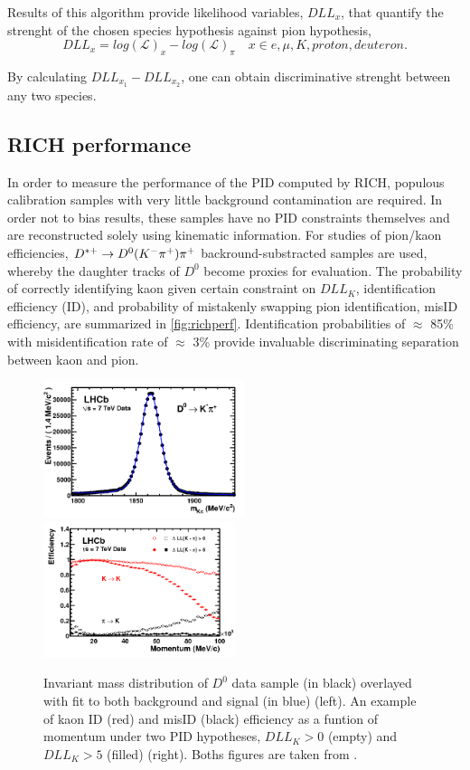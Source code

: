 Results of this algorithm provide likelihood variables, $DLL_{x}$, that quantify the strenght of the chosen species hypothesis against pion hypothesis,
\begin{equation}
	DLL_{x} = log(\mathcal{L})_{x} - log(\mathcal{L})_{\pi} \quad  x\in{e, \mu, K, proton, deuteron}.
\end{equation}

By calculating $DLL_{x_{1}} - DLL_{x_{2}}$, one can obtain discriminative strenght between any two species.

\subsection{RICH performance}
In order to measure the performance of the \Gls{PID} computed by RICH, populous calibration samples with very little background contamination are required. In order not to bias results, these samples have no \Gls{PID} constraints themselves and are reconstructed solely using kinematic information. For studies of pion/kaon efficiencies, $D^{*+} \rightarrow D^{0}({K}^{-}{{\pi}^+}){{\pi}^+}$ backround-substracted samples are used, whereby the daughter tracks of $D^{0}$ become proxies for evaluation. The probability of correctly identifying kaon given certain constraint on $DLL_{K}$, identification efficiency (\Gls{ID}), and probability of mistakenly swapping pion identification, \Gls{misID} efficiency, are summarized in \autoref{fig:richperf}. Identification probabilities of $\approx$ 85\% with misidentification rate of $\approx$ 3\% provide invaluable discriminating separation between kaon and pion.




\begin{figure}[!h]
	\centering
	\includegraphics[width = 0.525\textwidth]{figs/detector/D0mass.png}%
	\includegraphics[width = 0.5\textwidth]{figs/detector/RICHperfdata.png}%
	\caption{Invariant mass distribution of $D^{0}$ data sample (in black) overlayed with fit to both background and signal (in blue) (left). An example of kaon \Gls{ID} (red) and \Gls{misID} (black) efficiency as a funtion of momentum under two PID hypotheses, $DLL_{K} > 0$ (empty)  and $DLL_{K} > 5$ (filled) (right). Boths figures are taken from \cite{LHCb-DP-2012-003}.}
	\label{fig:richperf}
\end{figure}

